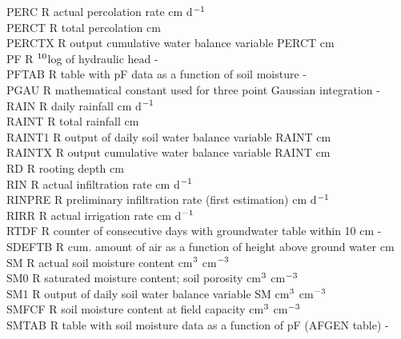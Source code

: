 \documentclass[11pt]{article}
\begin{document}
\begin{tabbing}
PERC\> \> R\> actual percolation rate\> \> \> \> \> \> \> cm d$^{{\rm -1}}$\\
PERCT\> \> R\> total percolation\> \> \> \> \> \> \> cm\\
PERCTX\> \> R\> output cumulative water balance variable PERCT\> \> \> \> \> \> \> cm\\
PF\> \> R\> $^{{\rm 10}}$log of hydraulic head\> \> \> \> \> \> \> -\\
PFTAB\> \> R\> table with pF data as a function of soil moisture\> \> \> \> \> \> \> -\\
PGAU\> \> R\> mathematical constant used for three point Gaussian integration\> \> \> \> \> \> \> -\\
RAIN\> \> R\> daily rainfall\> \> \> \> \> \> \> cm d$^{{\rm -1}}$\\
RAINT\> \> R\> total rainfall\> \> \> \> \> \> \> cm\\
RAINT1\> \> R\> output of daily soil water balance variable RAINT\> \> \> \> \> \> \> cm\\
RAINTX\> \> R\> output cumulative water balance variable RAINT\> \> \> \> \> \> \> cm\\
RD\> \> R\> rooting depth\> \> \> \> \> \> \> cm\\
RIN\> \> R\> actual infiltration rate\> \> \> \> \> \> \> cm d$^{{\rm -1}}$\\
RINPRE\> \> R\> preliminary infiltration rate (first estimation)\> \> \> \> \> \> \> cm d$^{{\rm -1}}$\\
RIRR\> \> R\> actual irrigation rate\> \> \> \> \> \> \> cm d$^{{\rm -1}}$\\
RTDF\> \> R\> counter of consecutive days with groundwater table within 10 cm\> \> \> \> \> \> \> -\\
SDEFTB\> \> R\> cum. amount of air as a function of height above ground water\> \> \> \> \> \> \> cm \\
SM\> \> R\> actual soil moisture content\> \> \> \> \> \> \> cm$^{{\rm 3}}$ cm$^{{\rm -3}}$\\
SM0\> \> R\> saturated moisture content; soil porosity\> \> \> \> \> \> \> cm$^{{\rm 3}}$ cm$^{{\rm -3}}$\\
SM1\> \> R\> output of daily soil water balance variable SM\> \> \> \> \> \> \> cm$^{{\rm 3}}$ cm$^{{\rm -3}}$\\
SMFCF\> \> R\> soil moisture content at field capacity\> \> \> \> \> \> \> cm$^{{\rm 3}}$ cm$^{{\rm -3}}$\\
SMTAB\> \> R\> table with soil moisture data as a function of pF (AFGEN table)\> \> \> \> \> \> \> -\\

\end{tabbing}
\end{document}
